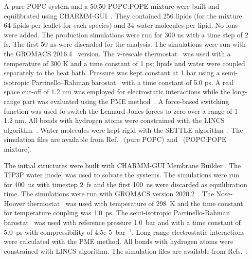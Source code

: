 \documentclass[journal=jpcbfk]{achemso}
\begin{document}
A pure POPC system and a 50:50 POPC:POPE mixture were built and equilibrated using CHARMM-GUI~\cite{lee16}.
They contained 256 lipids (for the mixture 64 lipids per leaflet for each species) and 34 water molecules per lipid.
No ions were added.
The production simulations were run for 300 ns with a time step of 2 fs.
The first 50 ns were discarded for the analysis.
The simulations were run with the GROMACS 2016.4~\cite{abraham2015gromacs} version.
The v-rescale thermostat~\cite{bussi07} was used with a temperature of 300 K and a time constant of 1 ps; lipids and water were coupled separately to the heat bath.
Pressure was kept constant at 1 bar using a semi-isotropic Parrinello--Rahman barostat~\cite{parrinello81} with a time constant of 5.0 ps.
A real space cut-off of 1.2 nm was employed for electrostatic interactions while the long-range part was evaluated using the PME method~\cite{darden93,essman95}.
A force-based switching function was used to switch the Lennard-Jones forces to zero over a range of 1--1.2 nm.
All bonds with hydrogen atoms were constrained with the LINCS algorithm~\cite{hess07,hess97}.
Water molecules were kept rigid with the SETTLE algorithm~\cite{miyamoto92}.
The simulation files are available from Ref.~ (pure POPC) and~ (POPC:POPE mixture).

The initial structures were built with CHARMM-GUI Membrane Builder \cite{lee16}. The TIP3P water model was used to solvate the systems. The simulations were run for 400~ns with timestep 2~fs and the first 100~ns were discarded as equilibration time. The simulations were run with GROMACS version 2020.2~\cite{pall20}. The Nose-Hoover thermostat~\cite{nose84,hoover85} was used with temperature of 298~K and the time constant for temperature coupling was 1.0~ps. The semi-isotropic Parrinello-Rahman barostat~\cite{parrinello81} was used with reference pressure 1.0~bar and with a time constant of 5.0~ps with compressibility of 4.5e-5~bar$^{-1}$. Long range electrostatic interactions were calculated with the PME method. All bonds with hydrogen atoms were constrained with LINCS algorithm.
The simulation files are available from Refs.~.
\end{document}
